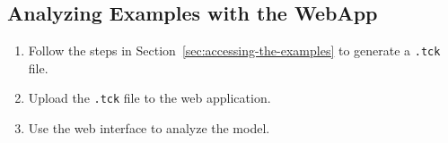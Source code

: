 \documentclass{article}
\begin{document}
\subsection{Analyzing Examples with the WebApp}
\begin{enumerate}
    \item Follow the steps in Section~\ref{sec:accessing-the-examples} to generate a \texttt{.tck} file.
    \item Upload the \texttt{.tck} file to the web application.
    \item Use the web interface to analyze the model.
\end{enumerate}
\end{document}

